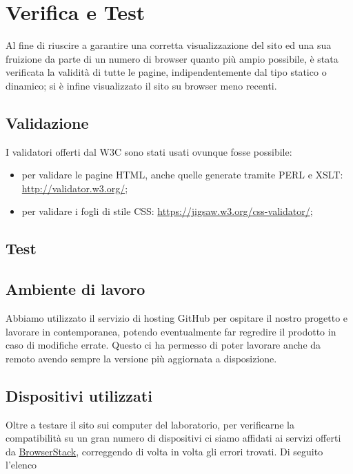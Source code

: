 \section{Verifica e Test}{
	Al fine di riuscire a garantire una corretta visualizzazione del sito ed una sua fruizione da parte di un numero di browser quanto più ampio possibile, è stata verificata la validità di tutte le pagine, indipendentemente dal tipo statico o dinamico; si è infine visualizzato il sito su browser meno recenti.
	\subsection{Validazione}{
		I validatori offerti dal W3C sono stati usati ovunque fosse possibile:
		\begin{itemize}\itemsep1pt
			\item per validare le pagine HTML, anche quelle generate tramite PERL e XSLT: \url{http://validator.w3.org/};
			\item per validare i fogli di stile CSS: \url{https://jigsaw.w3.org/css-validator/};
		\end{itemize}
	}
	\subsection{Test}{
	}
	\subsection{Ambiente di lavoro}{
		Abbiamo utilizzato il servizio di hosting GitHub per ospitare il nostro progetto e lavorare in contemporanea, potendo eventualmente far regredire il prodotto in caso di modifiche errate. Questo ci ha permesso di poter lavorare anche da remoto avendo sempre la versione più aggiornata a disposizione.
	}
	\subsection{Dispositivi utilizzati}{
		Oltre a testare il sito sui computer del laboratorio, per verificarne la compatibilità su un gran numero di dispositivi ci siamo affidati ai servizi offerti da \href{https://www.browserstack.com/screenshots}{BrowserStack}, correggendo di volta in volta gli errori trovati.  Di seguito l'elenco 
	}
}
